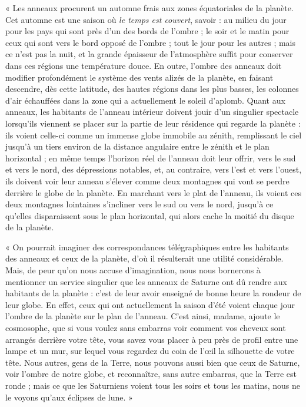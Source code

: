 \documentclass[a4paper, 11pt, oneside]{article}
\begin{document}
« Les anneaux procurent un automne frais aux zones équatoriales de la planète. Cet automne est une saison où \emph{le temps est couvert}, savoir : au milieu du jour pour les pays qui sont près d'un des bords de l'ombre ; le soir et le matin pour ceux qui sont vers le bord opposé de l'ombre ; tout le jour pour les autres ; mais ce n'est pas la nuit, et la grande épaisseur de l'atmosphère suffit pour conserver dans ces régions une température douce. En outre, l'ombre des anneaux doit modifier profondément le système des vents alizés de la planète, en faisant descendre, dès cette latitude, des hautes régions dans les plus basses, les colonnes d'air échauffées dans la zone qui a actuellement le soleil d'aplomb. Quant aux anneaux, les habitants de l'anneau intérieur doivent jouir d'un singulier spectacle lorsqu'ils viennent se placer sur la partie de leur résidence qui regarde la planète : ils voient celle-ci comme un immense globe immobile au zénith, remplissant le ciel jusqu'à un tiers environ de la distance angulaire entre le zénith et le plan horizontal ; en même temps l'horizon réel de l'anneau doit leur offrir, vers le sud et vers le nord, des dépressions notables, et, au contraire, vers l'est et vers l'ouest, ils doivent voir leur anneau s'élever comme deux montagnes qui vont se perdre derrière le globe de la planète. En marchant vers le plat de l'anneau, ils voient ces deux montagnes lointaines s'incliner vers le sud ou vers le nord, jusqu'à ce qu'elles disparaissent sous le plan horizontal, qui alors cache la moitié du disque de la planète.

« On pourrait imaginer des correspondances télégraphiques entre les habitants des anneaux et ceux de la planète, d'où il résulterait une utilité considérable. Mais, de peur qu'on nous accuse d'imagination, nous nous bornerons à mentionner un service singulier que les anneaux de Saturne ont dû rendre aux habitants de la planète : c'est de leur avoir enseigné de bonne heure la rondeur de leur globe. En effet, ceux qui ont actuellement la saison d'été voient chaque jour l'ombre de la planète sur le plan de l'anneau. C'est ainsi, madame, ajoute le cosmosophe, que si vous voulez sans embarras voir comment vos cheveux sont arrangés derrière votre tête, vous savez vous placer à peu près de profil entre une lampe et un mur, sur lequel vous regardez du coin de l'œil la silhouette de votre tête. Nous autres, gens de la Terre, nous pouvons aussi bien que ceux de Saturne, voir l'ombre de notre globe, et reconnaître, sans autre embarras, que la Terre est ronde ; mais ce que les Saturniens voient tous les soirs et tous les matins, nous ne le voyons qu'aux éclipses de lune. »
\end{document}
